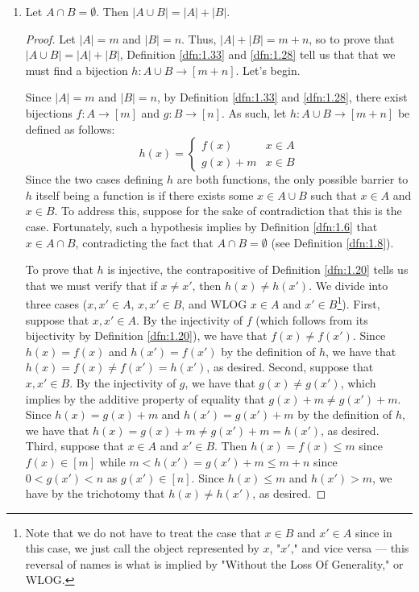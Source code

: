 \documentclass[../main.tex]{subfiles}
\begin{document}
\begin{exercise}
\begin{enumerate}[label={\alph*)},ref={\thetheorem\alph*}]
\begin{proof}
        \end{proof}
        \item \label{trm:1.34b}Let $A\cap B=\emptyset$. Then $|A\cup B|=|A|+|B|$.
        \begin{proof}
            Let $|A|=m$ and $|B|=n$. Thus, $|A|+|B|=m+n$, so to prove that $|A\cup B|=|A|+|B|$, Definition \ref{dfn:1.33} and \ref{dfn:1.28} tell us that that we must find a bijection $h:A\cup B\to[m+n]$. Let's begin.\par
            Since $|A|=m$ and $|B|=n$, by Definition \ref{dfn:1.33} and \ref{dfn:1.28}, there exist bijections $f:A\to[m]$ and $g:B\to[n]$. As such, let $h:A\cup B\to[m+n]$ be defined as follows:
            \begin{equation*}
                h(x) =
                \begin{cases}
                    f(x) & x\in A\\
                    g(x)+m & x\in B
                \end{cases}
            \end{equation*}
            Since the two cases defining $h$ are both functions, the only possible barrier to $h$ itself being a function is if there exists some $x\in A\cup B$ such that $x\in A$ and $x\in B$. To address this, suppose for the sake of contradiction that this is the case. Fortunately, such a hypothesis implies by Definition \ref{dfn:1.6} that $x\in A\cap B$, contradicting the fact that $A\cap B=\emptyset$ (see Definition \ref{dfn:1.8}).\par
            To prove that $h$ is injective, the contrapositive of Definition \ref{dfn:1.20} tells us that we must verify that if $x\neq x'$, then $h(x)\neq h(x')$. We divide into three cases ($x,x'\in A$, $x,x'\in B$, and WLOG $x\in A$ and $x'\in B$\footnote{Note that we do not have to treat the case that $x\in B$ and $x'\in A$ since in this case, we just call the object represented by $x$, "$x'$," and vice versa --- this reversal of names is what is implied by "Without the Loss Of Generality," or WLOG.}). First, suppose that $x,x'\in A$. By the injectivity of $f$ (which follows from its bijectivity by Definition \ref{dfn:1.20}), we have that $f(x)\neq f(x')$. Since $h(x)=f(x)$ and $h(x')=f(x')$ by the definition of $h$, we have that $h(x)=f(x)\neq f(x')=h(x')$, as desired. Second, suppose that $x,x'\in B$. By the injectivity of $g$, we have that $g(x)\neq g(x')$, which implies by the additive property of equality that $g(x)+m\neq g(x')+m$. Since $h(x)=g(x)+m$ and $h(x')=g(x')+m$ by the definition of $h$, we have that $h(x)=g(x)+m\neq g(x')+m=h(x')$, as desired. Third, suppose that $x\in A$ and $x'\in B$. Then $h(x)=f(x)\leq m$ since $f(x)\in[m]$ while $m<h(x')=g(x')+m\leq m+n$ since $0<g(x')<n$ as $g(x')\in[n]$. Since $h(x)\leq m$ and $h(x')>m$, we have by the trichotomy that $h(x)\neq h(x')$, as desired.\par

\end{proof}
\end{enumerate}
\end{exercise}
\end{document}
